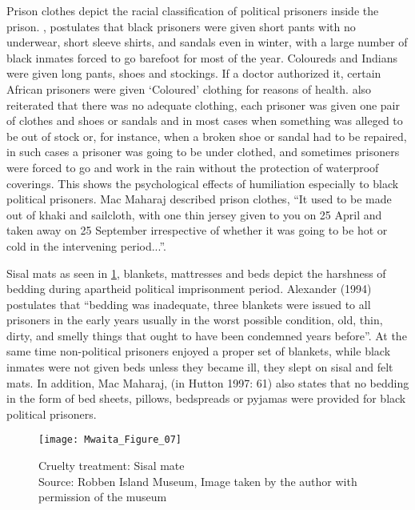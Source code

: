 Prison clothes depict the racial classification of political prisoners inside the prison. \textcite{Alexander_1994}, postulates that black prisoners were given short pants with no underwear, short sleeve shirts, and sandals even in winter, with a large number of black inmates forced to go barefoot for most of the year. Coloureds and Indians were given long pants, shoes and stockings. If a doctor authorized it, certain African prisoners were given ‘Coloured’ clothing for reasons of health. \textcite{Alexander_1994} also reiterated that there was no adequate clothing, each prisoner was given one pair of clothes and shoes or sandals and in most cases when something was alleged to be out of stock or, for instance, when a broken shoe or sandal had to be repaired, in such cases a prisoner was going to be under clothed, and sometimes prisoners were forced to go and work in the rain without the protection of waterproof coverings. This shows the psychological effects of humiliation especially to black political prisoners. Mac Maharaj \parencite[in][62]{Hutton_1997} described prison clothes, “It used to be made out of khaki and sailcloth, with one thin jersey given to you on 25 April and taken away on 25 September irrespective of whether it was going to be hot or cold in the intervening period...”.

Sisal mats as seen in \cref{fig:Mwaita_Figure_07}, blankets, mattresses and beds depict the harshness of bedding during apartheid political imprisonment period. Alexander (1994) postulates that “bedding was inadequate, three blankets were issued to all prisoners in the early years usually in the worst possible condition, old, thin, dirty, and smelly things that ought to have been condemned years before”. At the same time non-political prisoners enjoyed a proper set of blankets, while black inmates were not given beds unless they became ill, they slept on sisal and felt mats.  In addition, Mac Maharaj, (in Hutton 1997: 61) also states that no bedding in the form of bed sheets, pillows, bedspreads or pyjamas were provided for black political prisoners.

\begin{figure}[!tb]
	\texttt{[image: Mwaita\_Figure\_07]}
	\caption{Cruelty treatment: Sisal mate
  {\normalfont\scriptsize \\ Source: Robben Island Museum, Image taken by the author with permission of the museum
                    }}
	\label{fig:Mwaita_Figure_07}
\end{figure}

